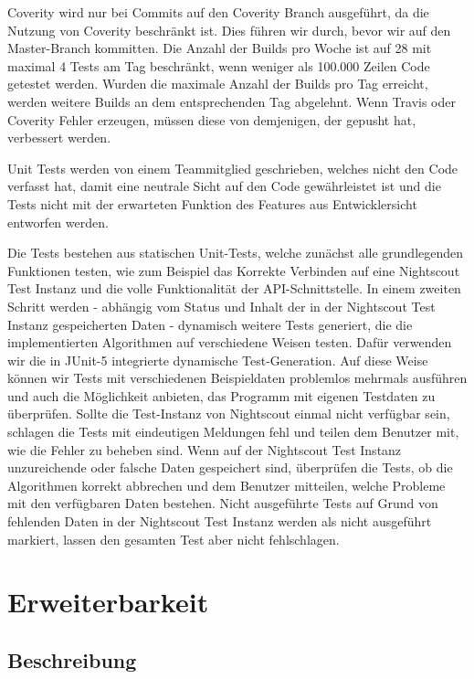 \documentclass[accentcolor=tud0b,12pt,paper=a4]{tudreport}
\begin{document}
Coverity wird nur bei Commits auf den Coverity Branch ausgeführt, da die Nutzung von Coverity beschränkt ist. Dies führen wir durch, bevor wir auf den Master-Branch kommitten. Die Anzahl der Builds pro Woche ist auf 28 mit maximal 4 Tests am Tag beschränkt, wenn weniger als 100.000 Zeilen Code getestet werden. Wurden die maximale Anzahl der Builds pro Tag erreicht, werden weitere Builds an dem entsprechenden Tag abgelehnt. Wenn Travis oder Coverity Fehler erzeugen, müssen diese von demjenigen, der gepusht hat, verbessert werden. 

Unit Tests werden von einem Teammitglied geschrieben, welches nicht den Code verfasst hat, damit eine neutrale Sicht auf den Code gewährleistet ist und die Tests nicht mit der erwarteten Funktion des Features aus Entwicklersicht entworfen werden.

Die Tests bestehen aus statischen Unit-Tests, welche zunächst alle grundlegenden Funktionen testen, wie zum Beispiel das Korrekte Verbinden auf eine Nightscout Test Instanz und die volle Funktionalität der API-Schnittstelle. In einem zweiten Schritt werden - abhängig vom Status und Inhalt der in der Nightscout Test Instanz gespeicherten Daten - dynamisch weitere Tests generiert, die die implementierten Algorithmen auf verschiedene Weisen testen. Dafür verwenden wir die in JUnit-5 integrierte dynamische Test-Generation. Auf diese Weise können wir Tests mit verschiedenen Beispieldaten problemlos mehrmals ausführen und auch die Möglichkeit anbieten, das Programm mit eigenen Testdaten zu überprüfen. Sollte die Test-Instanz von Nightscout einmal nicht verfügbar sein, schlagen die Tests mit eindeutigen Meldungen fehl und teilen dem Benutzer mit, wie die Fehler zu beheben sind. Wenn auf der Nightscout Test Instanz unzureichende oder falsche Daten gespeichert sind, überprüfen die Tests, ob die Algorithmen korrekt abbrechen und dem Benutzer mitteilen, welche Probleme mit den verfügbaren Daten bestehen. Nicht ausgeführte Tests auf Grund von fehlenden Daten in der Nightscout Test Instanz  werden als nicht ausgeführt markiert, lassen den gesamten Test aber nicht fehlschlagen.

\newpage

\section{Erweiterbarkeit}

\subsection{Beschreibung}
\end{document}
